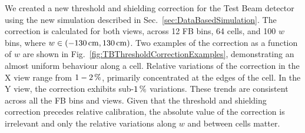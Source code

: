 We created a new threshold and shielding correction for the Test Beam detector using the new simulation described in Sec.~\ref{sec:DataBasedSimulation}. The correction is calculated for both views, across 12 \gls{FB} bins, 64 cells, and 100 $w$ bins, where $w\in\left(\unit[-130]{cm},\unit[130]{cm}\right)$. Two examples of the correction as a function of $w$ are shown in Fig.~\ref{fig:TBThresholdCorrectionExamples}, demonstrating an almost uniform behaviour along a cell. Relative variations of the correction in the X view range from $\unit[1-2]{\%}$,  primarily concentrated at the edges of the cell. In the Y view, the correction exhibits sub-$\unit[1]{\%}$ variations. These trends are consistent across all the \gls{FB} bins and views. Given that the threshold and shielding correction precedes relative calibration, the absolute value of the correction is irrelevant and only the relative variations along $w$ and between cells matter.
 
